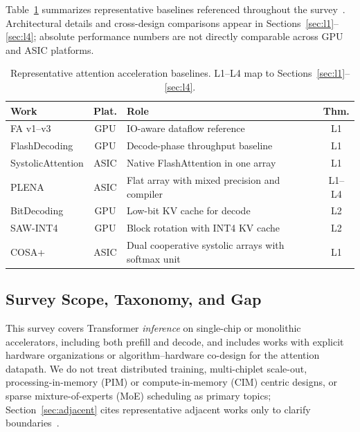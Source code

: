 \documentclass[conference]{IEEEtran}
\begin{document}
Table~\ref{tab:baselines} summarizes representative baselines referenced throughout the survey~\cite{dao2022flashattention,dao2023flashattention2,shah2024flashattention3,dao2023flashdecoding,lin2025systolicattention,plena2025,bitdecoding2026,sawint42026,wang2023cosa}.
Architectural details and cross-design comparisons appear in Sections~\ref{sec:l1}--\ref{sec:l4}; absolute performance numbers are not directly comparable across GPU and ASIC platforms.

\begin{table}[t]
\caption{Representative attention acceleration baselines.
L1--L4 map to Sections~\ref{sec:l1}--\ref{sec:l4}.}
\label{tab:baselines}
\centering
\footnotesize
\setlength{\tabcolsep}{4pt}
\begin{tabularx}{\columnwidth}{@{}l c >{\raggedright\arraybackslash}X c@{}}
\hline
\textbf{Work} & \textbf{Plat.} & \textbf{Role} & \textbf{Thm.} \\
\hline
FA v1--v3 & GPU & IO-aware dataflow reference & L1 \\
FlashDecoding & GPU & Decode-phase throughput baseline & L1 \\
SystolicAttention & ASIC & Native FlashAttention in one array & L1 \\
PLENA & ASIC & Flat array with mixed precision and compiler & L1--L4 \\
BitDecoding & GPU & Low-bit KV cache for decode & L2 \\
SAW-INT4 & GPU & Block rotation with INT4 KV cache & L2 \\
COSA+ & ASIC & Dual cooperative systolic arrays with softmax unit & L1 \\
\hline
\end{tabularx}
\end{table}

\subsection{Survey Scope, Taxonomy, and Gap}
\label{sec:intro-scope}

This survey covers Transformer \emph{inference} on single-chip or monolithic accelerators, including both prefill and decode, and includes works with explicit hardware organizations or algorithm--hardware co-design for the attention datapath.
We do not treat distributed training, multi-chiplet scale-out, processing-in-memory (PIM) or compute-in-memory (CIM) centric designs, or sparse mixture-of-experts (MoE) scheduling as primary topics; Section~\ref{sec:adjacent} cites representative adjacent works only to clarify boundaries~\cite{salca2026,liu2021sanger,amma2026,lolpim2024,heo2024nuepim}.
\end{document}
